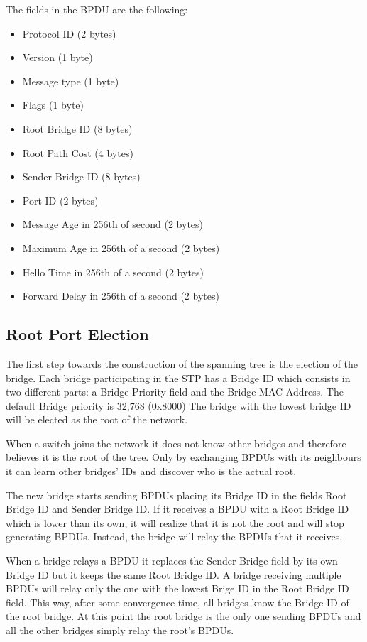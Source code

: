 The fields in the BPDU are the following:
\begin{itemize}
\item Protocol ID (2 bytes)
\item Version (1 byte)
\item Message type (1 byte)
\item Flags (1 byte)
\item Root Bridge ID (8 bytes)
\item Root Path Cost (4 bytes)
\item Sender Bridge ID (8 bytes)
\item Port ID (2 bytes)
\item Message Age in 256th of second (2 bytes)
\item Maximum Age in 256th of a second (2 bytes)
\item Hello Time in 256th of a second (2 bytes)
\item Forward Delay in 256th of a second (2 bytes)
\end{itemize}

\subsection{Root Port Election}

The first step towards the construction of the spanning tree is the election of the bridge.
Each bridge participating in the STP has a Bridge ID which consists in two different parts: a Bridge Priority field and the Bridge MAC Address.
The default Bridge priority is 32,768 (0x8000)
The bridge with the lowest bridge ID will be elected as the root of the network.

When a switch joins the network it does not know other bridges and therefore believes it is the root of the tree.
Only by exchanging BPDUs with its neighbours it can learn other bridges' IDs and discover who is the actual root.

The new bridge starts sending BPDUs placing its Bridge ID in the fields Root Bridge ID and Sender Bridge ID.
If it receives a BPDU with a Root Bridge ID which is lower than its own, it will realize that it is not the root and will stop generating BPDUs.
Instead, the bridge will relay the BPDUs that it receives.

When a bridge relays a BPDU it replaces the Sender Bridge field by its own Bridge ID but it keeps the same Root Bridge ID.
A bridge receiving multiple BPDUs will relay only the one with the lowest Brige ID in the Root Bridge ID field.
This way, after some convergence time, all bridges know the Bridge ID of the root bridge.
At this point the root bridge is the only one sending BPDUs and all the other bridges simply relay the root's BPDUs.

